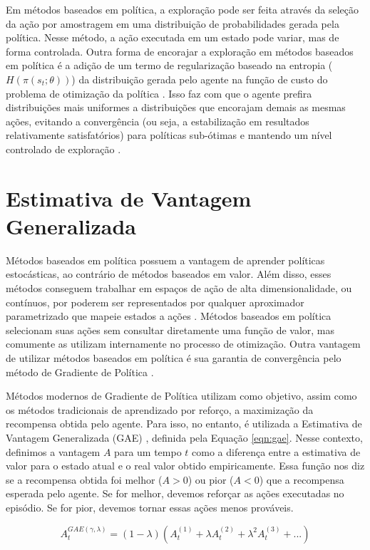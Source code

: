 Em métodos baseados em política, a exploração pode ser feita através da seleção da ação por amostragem em uma distribuição de probabilidades gerada pela política. Nesse método, a ação executada em um estado pode variar, mas de forma controlada. Outra forma de encorajar a exploração em métodos baseados em política é a adição de um termo de regularização baseado na entropia ($H(\pi(s_t; \theta))$) da distribuição gerada pelo agente na função de custo do problema de otimização da política \cite{a3c, williamspeng}. Isso faz com que o agente prefira distribuições mais uniformes a distribuições que encorajam demais as mesmas ações, evitando a convergência (ou seja, a estabilização em resultados relativamente satisfatórios) para políticas sub-ótimas e mantendo um nível controlado de exploração \cite{a3c, williamspeng}.

\section{Estimativa de Vantagem Generalizada}
\label{sec:gae}

Métodos baseados em política possuem a vantagem de aprender políticas estocásticas, ao contrário de métodos baseados em valor. Além disso, esses métodos conseguem trabalhar em espaços de ação de alta dimensionalidade, ou contínuos, por poderem ser representados por qualquer aproximador parametrizado que mapeie estados a ações \cite{suttonbarto}. Métodos baseados em política selecionam suas ações sem consultar diretamente uma função de valor, mas comumente as utilizam internamente no processo de otimização. Outra vantagem de utilizar métodos baseados em política é sua garantia de convergência pelo método de Gradiente de Política \cite{policygradients}.

Métodos modernos de Gradiente de Política utilizam como objetivo, assim como os métodos tradicionais de aprendizado por reforço, a maximização da recompensa obtida pelo agente. Para isso, no entanto, é utilizada a Estimativa de Vantagem Generalizada (GAE) \cite{gae}, definida pela Equação \ref{eqn:gae}. Nesse contexto, definimos a vantagem $A$ para um tempo $t$ como a diferença entre a estimativa de valor para o estado atual e o real valor obtido empiricamente. Essa função nos diz se a recompensa obtida foi melhor ($A > 0$) ou pior ($A < 0$) que a recompensa esperada pelo agente. Se for melhor, devemos reforçar as ações executadas no episódio. Se for pior, devemos tornar essas ações menos prováveis.

\begin{equation}
\label{eqn:gae}
A_t^{GAE(\gamma, \lambda)} = (1 - \lambda)(A_t^{(1)} + \lambda A_t^{(2)} + \lambda^2A_t^{(3)} + ...)
\end{equation}

